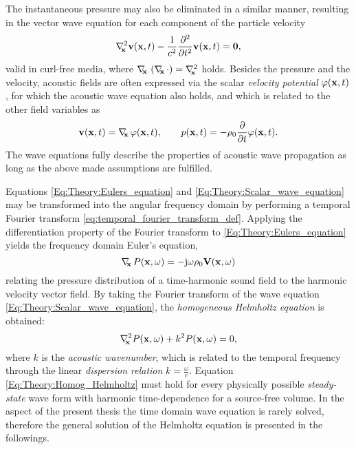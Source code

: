 The instantaneous pressure may also be eliminated in a similar manner, resulting in the vector wave equation for each component of the particle velocity
\begin{equation}
\nabla^2_{\!\!\mathbf{x}} \mathbf{v}(\mathbf{x},t) - \frac{1}{c^2} \frac{\partial^2}{\partial t^2} \mathbf{v}(\mathbf{x},t) = \mathbf{0},
\label{Eq:Theory:Vector_wave_equation}
\end{equation}
valid in curl-free media, where $\nabla_{\!\!\mathbf{x}}\, \left( \nabla_{\!\!\mathbf{x}}\, \cdot \right) = \nabla^2_{\!\!\mathbf{x}}$ holds.
%
Besides the pressure and the velocity, acoustic fields are often expressed via the scalar \emph{velocity potential} $\varphi(\mathbf{x},t)$, for which the acoustic wave equation also holds, and which is related to the other field variables as 
\begin{equation}
\mathbf{v}(\mathbf{x},t) = \nabla_{\!\!\mathbf{x}}\, \varphi(\mathbf{x},t), \hspace{7mm} p(\mathbf{x},t) = -\rho_0 \frac{\partial}{\partial t} \varphi(\mathbf{x},t).
\label{eq:theory:velocity_potential_definition}
\end{equation}
%
The wave equations fully describe the properties of acoustic wave propagation as long as the above made assumptions are fulfilled.

\vspace{3mm}
%
Equations \eqref{Eq:Theory:Eulers_equation} and \eqref{Eq:Theory:Scalar_wave_equation} may be transformed into the angular frequency domain by performing a temporal Fourier transform  \eqref{eq:temporal_fourier_transform_def}.
Applying the differentiation property of the Fourier transform to \eqref{Eq:Theory:Eulers_equation} yields the frequency domain Euler's equation,
\begin{equation}
\nabla_{\!\!\mathbf{x}}\, P(\mathbf{x},\omega) = -\mathrm{j} \omega \rho_0 \mathbf{V}(\mathbf{x},\omega)
\label{Eq:Theory:Freq_Eulers_equation}
\end{equation}
relating the pressure distribution of a time-harmonic sound field to the harmonic velocity vector field.
By taking the Fourier transform of the wave equation \eqref{Eq:Theory:Scalar_wave_equation}, the \emph{homogeneous Helmholtz equation} is obtained:
\begin{equation}
\nabla^2_{\!\!\mathbf{x}} P(\mathbf{x},\omega) + k^2 P(\mathbf{x},\omega) = 0,
\label{Eq:Theory:Homog_Helmholtz}
\end{equation}
where $k$ is the \emph{acoustic wavenumber}, which is related to the temporal frequency through the linear \emph{dispersion relation} $k = \frac{\omega}{c}$.
%
Equation \eqref{Eq:Theory:Homog_Helmholtz} must hold for every physically possible \emph{steady-state} wave form with harmonic time-dependence for a source-free volume. 
In the aspect of the present thesis the time domain wave equation is rarely solved, therefore the general solution of the Helmholtz equation is presented in the followings.


